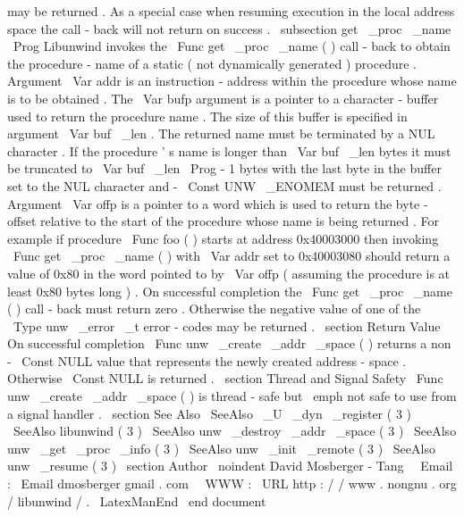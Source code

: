 may
be
returned
.
As
a
special
case
when
resuming
execution
in
the
local
address
space
the
call
-
back
will
not
return
on
success
.
\
subsection
{
get
\
_proc
\
_name
}
\
Prog
{
Libunwind
}
invokes
the
\
Func
{
get
\
_proc
\
_name
}
(
)
call
-
back
to
obtain
the
procedure
-
name
of
a
static
(
not
dynamically
generated
)
procedure
.
Argument
\
Var
{
addr
}
is
an
instruction
-
address
within
the
procedure
whose
name
is
to
be
obtained
.
The
\
Var
{
bufp
}
argument
is
a
pointer
to
a
character
-
buffer
used
to
return
the
procedure
name
.
The
size
of
this
buffer
is
specified
in
argument
\
Var
{
buf
\
_len
}
.
The
returned
name
must
be
terminated
by
a
NUL
character
.
If
the
procedure
'
s
name
is
longer
than
\
Var
{
buf
\
_len
}
bytes
it
must
be
truncated
to
\
Var
{
buf
\
_len
}
\
Prog
{
-
1
}
bytes
with
the
last
byte
in
the
buffer
set
to
the
NUL
character
and
-
\
Const
{
UNW
\
_ENOMEM
}
must
be
returned
.
Argument
\
Var
{
offp
}
is
a
pointer
to
a
word
which
is
used
to
return
the
byte
-
offset
relative
to
the
start
of
the
procedure
whose
name
is
being
returned
.
For
example
if
procedure
\
Func
{
foo
}
(
)
starts
at
address
0x40003000
then
invoking
\
Func
{
get
\
_proc
\
_name
}
(
)
with
\
Var
{
addr
}
set
to
0x40003080
should
return
a
value
of
0x80
in
the
word
pointed
to
by
\
Var
{
offp
}
(
assuming
the
procedure
is
at
least
0x80
bytes
long
)
.
On
successful
completion
the
\
Func
{
get
\
_proc
\
_name
}
(
)
call
-
back
must
return
zero
.
Otherwise
the
negative
value
of
one
of
the
\
Type
{
unw
\
_error
\
_t
}
error
-
codes
may
be
returned
.
\
section
{
Return
Value
}
On
successful
completion
\
Func
{
unw
\
_create
\
_addr
\
_space
}
(
)
returns
a
non
-
\
Const
{
NULL
}
value
that
represents
the
newly
created
address
-
space
.
Otherwise
\
Const
{
NULL
}
is
returned
.
\
section
{
Thread
and
Signal
Safety
}
\
Func
{
unw
\
_create
\
_addr
\
_space
}
(
)
is
thread
-
safe
but
\
emph
{
not
}
safe
to
use
from
a
signal
handler
.
\
section
{
See
Also
}
\
SeeAlso
{
\
_U
\
_dyn
\
_register
(
3
)
}
\
SeeAlso
{
libunwind
(
3
)
}
\
SeeAlso
{
unw
\
_destroy
\
_addr
\
_space
(
3
)
}
\
SeeAlso
{
unw
\
_get
\
_proc
\
_info
(
3
)
}
\
SeeAlso
{
unw
\
_init
\
_remote
(
3
)
}
\
SeeAlso
{
unw
\
_resume
(
3
)
}
\
section
{
Author
}
\
noindent
David
Mosberger
-
Tang
\
\
Email
:
\
Email
{
dmosberger
gmail
.
com
}
\
\
WWW
:
\
URL
{
http
:
/
/
www
.
nongnu
.
org
/
libunwind
/
}
.
\
LatexManEnd
\
end
{
document
}
